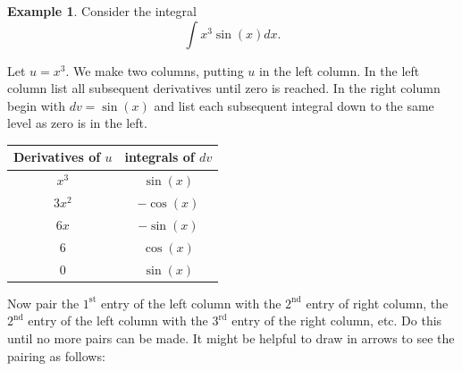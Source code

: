\documentclass[reqno]{amsart}
\theoremstyle{definition}
\newtheorem{eg}{Example}
\numberwithin{equation}{section}
\begin{document}
\begin{eg} Consider the integral
\[ \int x^3 \sin(x) dx.\]

Let $u=x^3$.  We make two columns, putting $u$ in the left column.  In the left column list all subsequent derivatives until zero is reached.  In the right column begin with $dv=\sin(x)$ and list each subsequent integral down to the same level as zero is in the left.

\begin{center}
\begin{tabular}{ |c|c|}
\hline
  Derivatives of $u$ & integrals of $dv$   \\
\hline
  $x^3$ & $\sin(x)$   \\
\hline
  $3x^2$ & $-\cos(x)$   \\
\hline
  $6x$ & $-\sin(x)$   \\
\hline
  $6 $& $\cos(x)$   \\
\hline
$0 $& $\sin(x)$   \\
\hline
\end{tabular}
\end{center}

Now pair the $1^{\text{st}}$ entry of the left column with the $2^{\text{nd}}$ entry of right column, the $2^{\text{nd}}$ entry of the left column with the $3^{\text{rd}}$ entry of the right column, etc.  Do this until no more pairs can be made.  It might be helpful to draw in arrows to see the pairing as follows:


\end{eg}
\end{document}
